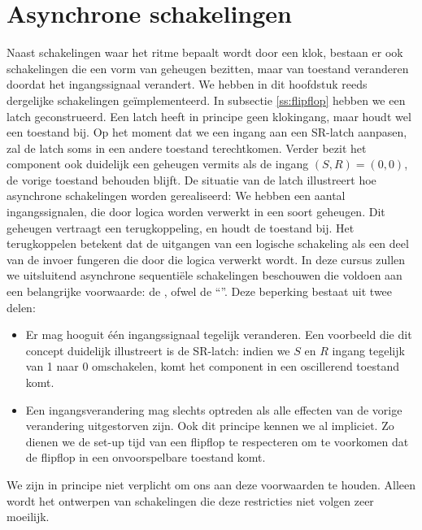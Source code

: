 \section{Asynchrone schakelingen}
\label{s:asynchroneSequence}
Naast schakelingen waar het ritme bepaalt wordt door een klok, bestaan er ook schakelingen die een vorm van geheugen bezitten, maar van toestand veranderen doordat het ingangssignaal verandert. We hebben in dit hoofdstuk reeds dergelijke schakelingen ge\"implementeerd. In subsectie \ref{ss:flipflop} hebben we een latch geconstrueerd. Een latch heeft in principe geen klokingang, maar houdt wel een toestand bij. Op het moment dat we een ingang aan een SR-latch aanpasen, zal de latch soms in een andere toestand terechtkomen. Verder bezit het component ook duidelijk een geheugen vermits als de ingang $\left(S,R\right)=\left(0,0\right)$, de vorige toestand behouden blijft. De situatie van de latch illustreert hoe asynchrone schakelingen worden gerealiseerd: We hebben een aantal ingangssignalen, die door logica worden verwerkt in een soort geheugen. Dit geheugen vertraagt een terugkoppeling, en houdt de toestand bij. Het terugkoppelen betekent dat de uitgangen van een logische schakeling als een deel van de invoer fungeren die door die logica verwerkt wordt. In deze cursus zullen we uitsluitend asynchrone sequenti\"ele schakelingen beschouwen die voldoen aan een belangrijke voorwaarde: de , ofwel de ``''. Deze beperking bestaat uit twee delen:
\begin{itemize}
 \item Er mag hooguit \'e\'en ingangssignaal tegelijk veranderen. Een voorbeeld die dit concept duidelijk illustreert is de SR-latch: indien we $S$ en $R$ ingang tegelijk van 1 naar 0 omschakelen, komt het component in een oscillerend toestand komt.
 \item Een ingangsverandering mag slechts optreden als alle effecten van de vorige verandering uitgestorven zijn. Ook dit principe kennen we al impliciet. Zo dienen we de set-up tijd van een flipflop te respecteren om te voorkomen dat de flipflop in een onvoorspelbare toestand komt.
\end{itemize}
We zijn in principe niet verplicht om ons aan deze voorwaarden te houden. Alleen wordt het ontwerpen van schakelingen die deze restricties niet volgen zeer moeilijk.
